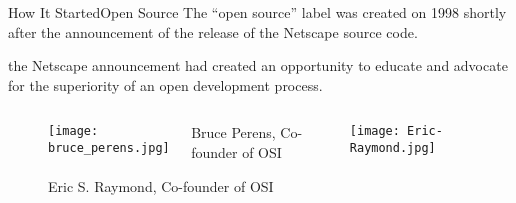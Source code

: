 \documentclass{beamer}
\begin{document}
    \begin{frame}{How It Started}{Open Source}
         The “open source” label was created on 1998 shortly after the announcement of the release of the Netscape source code.

         the Netscape announcement had created an opportunity to educate and advocate for the superiority of an open development process.\cite{OSIWEBSITE:2}
         \begin{figure}
             \begin{columns}
                     \centering
                     \texttt{[image: bruce\_perens.jpg]}
                     \caption{Bruce Perens, Co-founder of OSI\cite{bruseperensPhoto}}
                    \centering
                    \texttt{[image: Eric-Raymond.jpg]}
                    \caption{Eric S. Raymond, Co-founder of OSI\cite{ericRaymondPhoto}}
             \end{columns}
         \end{figure}
    \end{frame}
\end{document}
